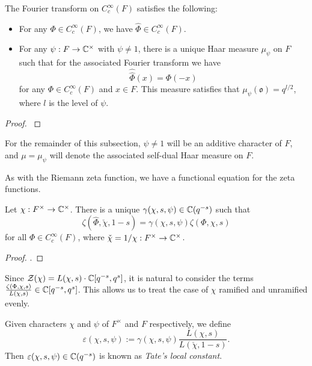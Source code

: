 \begin{prop}
    The Fourier transform on $C_c^\infty(F)$ satisfies the following:
    \begin{itemize}
        \item For any $\Phi \in C_c^\infty(F)$, we have $\hat{\Phi} \in C_c^\infty(F)$.
        \item For any $\psi: F \to \mathbb{C}^\times$ with $\psi \neq 1$, there is a unique Haar measure $\mu_\psi$ on $F$ such that for the associated Fourier transform we have $$\hat{\hat{\Phi}}(x) = \Phi(-x)$$ for any $\Phi \in C_c^\infty(F)$ and $x \in F$. This measure satisfies that $\mu_\psi(\mathfrak{o})=q^{l/2}$, where $l$ is the level of $\psi$.
    \end{itemize}
    
\end{prop}
\begin{proof}
    \cite[Proposition 23.1]{BH1}
\end{proof}

\begin{notn}
    For the remainder of this subsection, $\psi \neq 1$ will be an additive character of $F$, and $\mu= \mu_\psi$ will denote the associated self-dual Haar measure on $F$.
\end{notn}

As with the Riemann zeta function, we have a functional equation for the zeta functions.

\begin{thm}\label{thm:gl1gamma}
    Let $\chi: F^\times \to \mathbb{C}^\times$. There is a unique $\gamma(\chi,s,\psi) \in \mathbb{C}(q^{-s})$ such that 
    $$\zeta(\hat{\Phi}, \check{\chi},1-s) = \gamma(\chi,s,\psi) \zeta(\Phi,\chi,s)$$ for all $\Phi \in C_c^\infty(F)$, where $\check{\chi}=1/\chi : F^\times \to \mathbb{C}^\times$.
\end{thm}
\begin{proof}
    \cite[Theorem 23.3]{BH1}.
\end{proof}

Since $\mathcal Z(\chi) = L(\chi,s)\cdot \mathbb{C}[q^{-s},q^s]$, it is natural to consider the terms $\frac{\zeta(\Phi,\chi,s)}{L(\chi,s)} \in \mathbb{C}[q^{-s},q^s]$. This allows us to treat the case of $\chi$ ramified and unramified evenly. 

\begin{defn}
    Given characters $\chi$ and $\psi$ of $F^\times$ and $F$ respectively,  we define %
    $$\varepsilon(\chi,s,\psi) := \gamma(\chi,s,\psi)\frac{L(\chi,s)}{L(\check{\chi},1-s)}.$$
    Then $\varepsilon(\chi,s,\psi)\in\mathbb{C}(q^{-s})$ is known as \textit{Tate's local constant}.
\end{defn}

